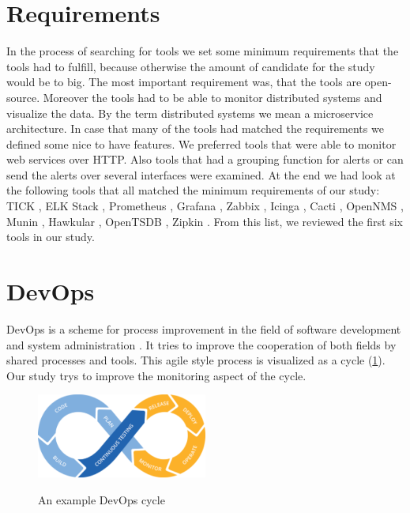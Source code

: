 \section{Requirements}
\label{minimumrequire}
In the process of searching for tools we set some minimum requirements that the tools had to fulfill, because otherwise the amount of candidate for the study would be to big. The most important requirement was, that the tools are open-source. Moreover the tools had to be able to monitor distributed systems and visualize the data. By the term distributed systems we  mean a microservice architecture.
In case that many of the tools had matched the requirements we defined some nice to have features. We preferred tools that were able to monitor web services over HTTP. Also tools that had a grouping function for alerts or can send the alerts over several interfaces were examined.
At the end we had look at the following tools that all matched the minimum requirements of our study: TICK \cite{tick}, ELK Stack \cite{elk}, Prometheus \cite{prometheus}, Grafana \cite{grafana}, Zabbix \cite{zabbix}, Icinga \cite{icinga}, Cacti \cite{cacti}, OpenNMS \cite{opennms}, Munin \cite{munin}, Hawkular \cite{hawkular}, OpenTSDB \cite{opentsdb}, Zipkin \cite{zipkin}. From this list, we reviewed the first six tools in our study.


\section{DevOps}
\label{devops}
DevOps is a scheme for process improvement in the field of software development and system administration \cite{Bass:2015:DSA:2810087}. It tries to improve the cooperation of both fields by shared processes and tools.
This agile style process is visualized as a cycle (\cref{fig:devopscycle}). Our study trys to improve the monitoring aspect of the cycle.
\begin{figure}
	\centering
	\includegraphics[width=0.5\textwidth]{Bilder/devopscycle}
	\caption{An example DevOps cycle}
	\label{fig:devopscycle}
	\cite{Devops}
\end{figure}